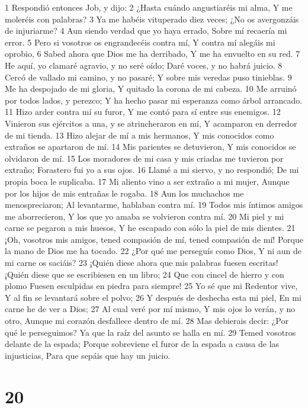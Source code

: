 1 Respondió entonces Job, y dijo:  
2 ¿Hasta cuándo angustiaréis mi alma,  
Y me moleréis con palabras?  
3 Ya me habéis vituperado diez veces;  
¿No os avergonzáis de injuriarme?  
4 Aun siendo verdad que yo haya errado,  
Sobre mí recaería mi error.  
5 Pero si vosotros os engrandecéis contra mí,  
Y contra mí alegáis mi oprobio,  
6 Sabed ahora que Dios me ha derribado,  
Y me ha envuelto en su red.  
7 He aquí, yo clamaré agravio, y no seré oído;  
Daré voces, y no habrá juicio.  
8 Cercó de vallado mi camino, y no pasaré;  
Y sobre mis veredas puso tinieblas.  
9 Me ha despojado de mi gloria,  
Y quitado la corona de mi cabeza.  
10 Me arruinó por todos lados, y perezco;  
Y ha hecho pasar mi esperanza como árbol arrancado.  
11 Hizo arder contra mí su furor,  
Y me contó para sí entre sus enemigos.  
12 Vinieron sus ejércitos a una, y se atrincheraron en mí,  
Y acamparon en derredor de mi tienda.  
13 Hizo alejar de mí a mis hermanos,  
Y mis conocidos como extraños se apartaron de mí.  
14 Mis parientes se detuvieron,  
Y mis conocidos se olvidaron de mí.  
15 Los moradores de mi casa y mis criadas me tuvieron por extraño;  
Forastero fui yo a sus ojos.  
16 Llamé a mi siervo, y no respondió;  
De mi propia boca le suplicaba.  
17 Mi aliento vino a ser extraño a mi mujer,  
Aunque por los hijos de mis entrañas le rogaba.  
18 Aun los muchachos me menospreciaron;  
Al levantarme, hablaban contra mí.  
19 Todos mis íntimos amigos me aborrecieron,  
Y los que yo amaba se volvieron contra mí.  
20 Mi piel y mi carne se pegaron a mis huesos,  
Y he escapado con sólo la piel de mis dientes.  
21 ¡Oh, vosotros mis amigos, tened compasión de mí, tened compasión de mí!  
Porque la mano de Dios me ha tocado.  
22 ¿Por qué me perseguís como Dios,  
Y ni aun de mi carne os saciáis?  
23 ¡Quién diese ahora que mis palabras fuesen escritas!  
¡Quién diese que se escribiesen en un libro;  
24 Que con cincel de hierro y con plomo  
Fuesen esculpidas en piedra para siempre!  
25 Yo sé que mi Redentor vive,  
Y al fin se levantará sobre el polvo;  
26 Y después de deshecha esta mi piel,  
En mi carne he de ver a Dios;  
27 Al cual veré por mí mismo,  
Y mis ojos lo verán, y no otro,  
Aunque mi corazón desfallece dentro de mí.  
28 Mas debierais decir: ¿Por qué le perseguimos?  
Ya que la raíz del asunto se halla en mí.  
29 Temed vosotros delante de la espada;  
Porque sobreviene el furor de la espada a causa de las injusticias,  
Para que sepáis que hay un juicio.  

\chapter{20}

